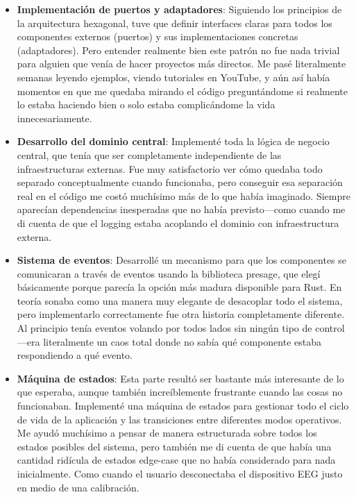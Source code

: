 \begin{itemize}
    \item \textbf{Implementación de puertos y adaptadores}: Siguiendo los principios de la arquitectura hexagonal, tuve que definir interfaces claras para todos los componentes externos (puertos) y sus implementaciones concretas (adaptadores). Pero entender realmente bien este patrón no fue nada trivial para alguien que venía de hacer proyectos más directos. Me pasé literalmente semanas leyendo ejemplos, viendo tutoriales en YouTube, y aún así había momentos en que me quedaba mirando el código preguntándome si realmente lo estaba haciendo bien o solo estaba complicándome la vida innecesariamente.
    
    \item \textbf{Desarrollo del dominio central}: Implementé toda la lógica de negocio central, que tenía que ser completamente independiente de las infraestructuras externas. Fue muy satisfactorio ver cómo quedaba todo separado conceptualmente cuando funcionaba, pero conseguir esa separación real en el código me costó muchísimo más de lo que había imaginado. Siempre aparecían dependencias inesperadas que no había previsto—como cuando me di cuenta de que el logging estaba acoplando el dominio con infraestructura externa.
    
    \item \textbf{Sistema de eventos}: Desarrollé un mecanismo para que los componentes se comunicaran a través de eventos usando la biblioteca presage, que elegí básicamente porque parecía la opción más madura disponible para Rust. En teoría sonaba como una manera muy elegante de desacoplar todo el sistema, pero implementarlo correctamente fue otra historia completamente diferente. Al principio tenía eventos volando por todos lados sin ningún tipo de control—era literalmente un caos total donde no sabía qué componente estaba respondiendo a qué evento.
    
    \item \textbf{Máquina de estados}: Esta parte resultó ser bastante más interesante de lo que esperaba, aunque también increíblemente frustrante cuando las cosas no funcionaban. Implementé una máquina de estados para gestionar todo el ciclo de vida de la aplicación y las transiciones entre diferentes modos operativos. Me ayudó muchísimo a pensar de manera estructurada sobre todos los estados posibles del sistema, pero también me di cuenta de que había una cantidad ridícula de estados edge-case que no había considerado para nada inicialmente. Como cuando el usuario desconectaba el dispositivo EEG justo en medio de una calibración.
    

\end{itemize}
